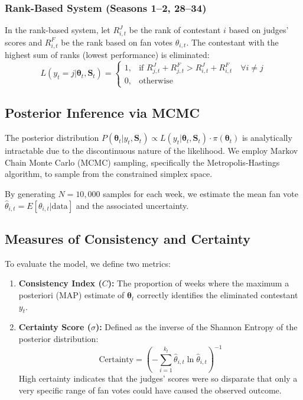 \documentclass[12pt]{article}
\begin{document}
\subsubsection{Rank-Based System (Seasons 1--2, 28--34)}
In the rank-based system, let $R^J_{i,t}$ be the rank of contestant $i$ based on judges' scores and $R^F_{i,t}$ be the rank based on fan votes $\theta_{i,t}$. The contestant with the highest sum of ranks (lowest performance) is eliminated:
\begin{equation}
    L(y_t=j | \bm{\theta}_t, \mathbf{S}_t) = 
    \begin{cases} 
    1, & \text{if } R^J_{j,t} + R^F_{j,t} > R^J_{i,t} + R^F_{i,t} \quad \forall i \neq j \\
    0, & \text{otherwise}
    \end{cases}
\end{equation}

\subsection{Posterior Inference via MCMC}
The posterior distribution $P(\bm{\theta}_t | y_t, \mathbf{S}_t) \propto L(y_t | \bm{\theta}_t, \mathbf{S}_t) \cdot \pi(\bm{\theta}_t)$ is analytically intractable due to the discontinuous nature of the likelihood. We employ Markov Chain Monte Carlo (MCMC) sampling, specifically the Metropolis-Hastings algorithm, to sample from the constrained simplex space.

By generating $N = 10,000$ samples for each week, we estimate the mean fan vote $\hat{\theta}_{i,t} = E[\theta_{i,t} | \text{data}]$ and the associated uncertainty.

\subsection{Measures of Consistency and Certainty}
To evaluate the model, we define two metrics:
\begin{enumerate}
    \item \textbf{Consistency Index ($C$):} The proportion of weeks where the maximum a posteriori (MAP) estimate of $\bm{\theta}_t$ correctly identifies the eliminated contestant $y_t$.
    \item \textbf{Certainty Score ($\sigma$):} Defined as the inverse of the Shannon Entropy of the posterior distribution:
    \begin{equation}
        \text{Certainty} = \left( - \sum_{i=1}^{k_t} \hat{\theta}_{i,t} \ln \hat{\theta}_{i,t} \right)^{-1}
    \end{equation}
    High certainty indicates that the judges' scores were so disparate that only a very specific range of fan votes could have caused the observed outcome.
\end{enumerate}
\end{document}
